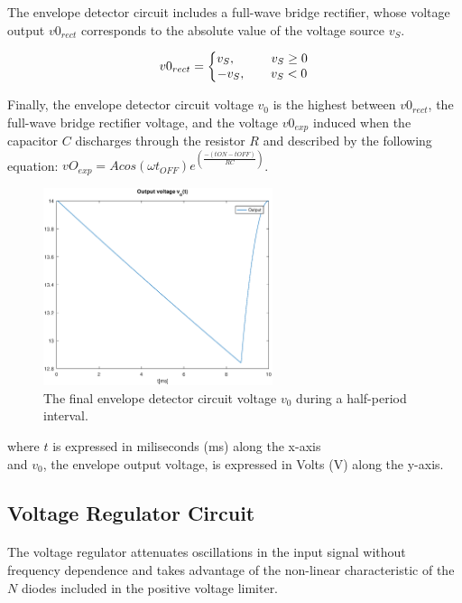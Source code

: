 The envelope detector circuit includes a full-wave bridge rectifier, whose voltage output $v0_{rect}$ corresponds to the absolute value of the voltage source $v_S$.

\[
v0_{rect} =
\left\{\begin{matrix}
v_S, \hspace{1cm} v_S \ge 0\\
-v_S,\hspace{0.7cm} v_S < 0\\
\end{matrix}\right.
\]

Finally, the envelope detector circuit voltage $v_0$ is the highest between $v0_{rect}$, the full-wave bridge rectifier voltage, and the voltage $v0_{exp}$ induced when the capacitor $C$ discharges through the resistor $R$ and described by the following equation: $vO_{exp}=Acos(\omega t_{OFF})e^(\frac{-({tON}-{tOFF})}{RC})$.


\begin{figure}[H] \centering
\includegraphics[width=0.6\textwidth]{envelope.eps}
\caption{The final envelope detector circuit voltage $v_0$ during a half-period interval.}
\label{fig:envelope}
\end{figure}

where $t$ is expressed in miliseconds (ms) along the x-axis\\
and $v_0$, the envelope output voltage, is expressed in Volts (V) along the y-axis.

\subsection{Voltage Regulator Circuit}
\label{subsec:regulator}

\paragraph{}
The voltage regulator attenuates oscillations in the input signal without frequency dependence and takes advantage of the non-linear characteristic of the $N$ diodes included in the positive voltage limiter. 


